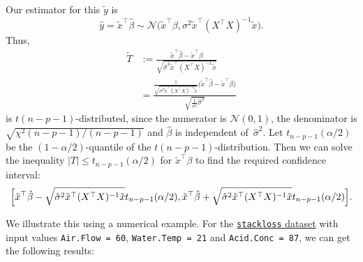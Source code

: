 \documentclass[
  a4paper,
]{article}
\theoremstyle{definition}
\theoremstyle{definition}
\theoremstyle{definition}
\theoremstyle{definition}
\theoremstyle{remark}
\begin{document}
Our estimator for this \(\tilde y\) is
\begin{equation*}
  \hat y
  = \tilde x^\top \hat\beta
  \sim \mathcal{N}\bigl( \tilde x^\top \beta, \sigma^2 \tilde x^\top (X^\top X)^{-1} \tilde x \bigr).
\end{equation*}
Thus,
\begin{align*}
  \tilde T
  &:= \frac{\tilde x^\top \hat\beta - \tilde x^\top \beta}
           {\sqrt{\hat\sigma^2 \tilde x^\top (X^\top X)^{-1} \tilde x}} \\
  &= \frac{\frac{1}{\sqrt{\sigma^2\tilde x^\top (X^\top X)^{-1} \tilde x}}\bigl(\tilde x^\top \hat\beta - \tilde x^\top \beta\bigr)}
           {\sqrt{\frac{1}{\sigma^2}\hat\sigma^2}}
\end{align*}
is \(t(n-p-1)\)-distributed, since the numerator is \(\mathcal{N}(0,1)\), the denominator
is \(\sqrt{\chi^2(n-p-1) / (n-p-1)}\) and \(\hat\beta\) is independent
of~\(\hat\sigma^2\).
Let \(t_{n-p-1}(\alpha/2)\) be the \((1 - \alpha/2)\)-quantile of the \(t(n-p-1)\)-distribution.
Then we can solve the inequality \(|T| \leq t_{n-p-1}(\alpha/2)\) for
\(\tilde x^\top \beta\) to find the required confidence interval:
\begin{equation*}
  \Bigl[
    \tilde x^\top \hat\beta - \sqrt{\hat\sigma^2 \tilde x^\top (X^\top X)^{-1} \tilde x} t_{n-p-1}(\alpha/2),
    \tilde x^\top \hat\beta + \sqrt{\hat\sigma^2 \tilde x^\top (X^\top X)^{-1} \tilde x} t_{n-p-1}(\alpha/2)
  \Bigr].
\end{equation*}

We illustrate this using a numerical example.
For the \href{https://rdrr.io/r/datasets/stackloss.html}{\texttt{stackloss} dataset}
with input values \texttt{Air.Flow\ =\ 60}, \texttt{Water.Temp\ =\ 21} and \texttt{Acid.Conc\ =\ 87},
we can get the following results:
\end{document}
